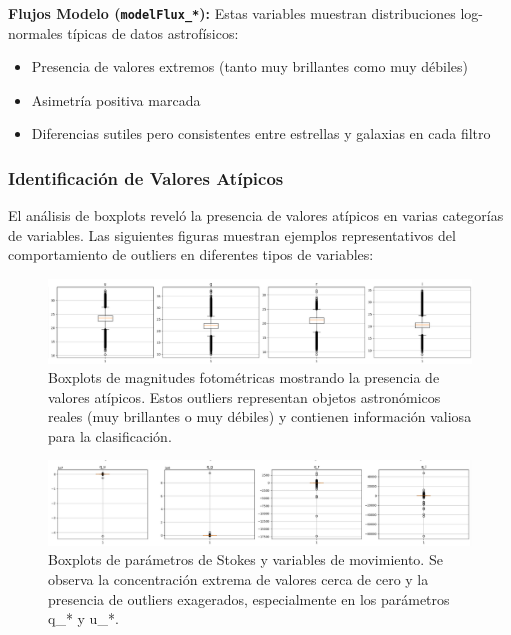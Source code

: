 \documentclass{article}
\begin{document}
\textbf{Flujos Modelo (\texttt{modelFlux\_*}):}
Estas variables muestran distribuciones log-normales típicas de datos astrofísicos:

\begin{itemize}
    \item Presencia de valores extremos (tanto muy brillantes como muy débiles)
    \item Asimetría positiva marcada
    \item Diferencias sutiles pero consistentes entre estrellas y galaxias en cada filtro
\end{itemize}

\subsubsection{Identificación de Valores Atípicos}

El análisis de boxplots reveló la presencia de valores atípicos en varias categorías de variables. Las siguientes figuras muestran ejemplos representativos del comportamiento de outliers en diferentes tipos de variables:

\begin{figure}[H]
    \centering
    \includegraphics[width=1.0\linewidth]{boxplot_1.png}
    \caption{Boxplots de magnitudes fotométricas mostrando la presencia de valores atípicos. Estos outliers representan objetos astronómicos reales (muy brillantes o muy débiles) y contienen información valiosa para la clasificación.}
    \label{fig:boxplot1}
\end{figure}

\begin{figure}[H]
    \centering
    \includegraphics[width=1.0\linewidth]{boxplot_2.png}
    \caption{Boxplots de parámetros de Stokes y variables de movimiento. Se observa la concentración extrema de valores cerca de cero y la presencia de outliers exagerados, especialmente en los parámetros q\_* y u\_*.}
    \label{fig:boxplot2}
\end{figure}
\end{document}
